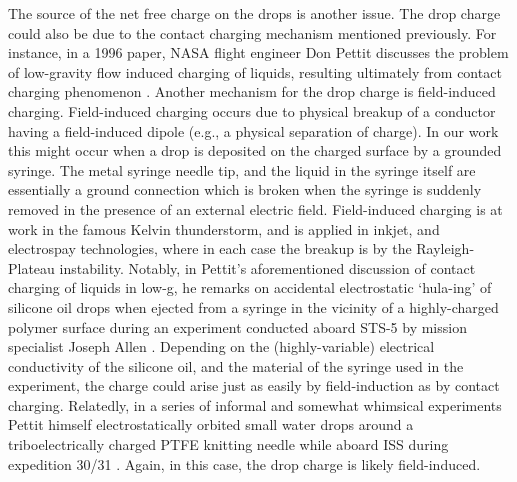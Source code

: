 \documentclass[12pt,a4paper,oneside]{book}
\begin{document}
The source of the net free charge on the drops is another issue. The drop charge could also be due to the contact charging mechanism mentioned previously. For instance, in a 1996 paper, NASA flight engineer Don Pettit discusses the problem of low-gravity flow induced charging of liquids, resulting ultimately from contact charging phenomenon \cite{pettit_donald_flow_????}. Another mechanism for the drop charge is field-induced charging. Field-induced charging occurs due to physical breakup of a conductor having a field-induced dipole (e.g., a physical separation of charge). In our work this might occur when a drop is deposited on the charged surface by a grounded syringe. The metal syringe needle tip, and the liquid in the syringe itself are essentially a ground connection which is broken when the syringe is suddenly removed in the presence of an external electric field. Field-induced charging is at work in the famous Kelvin thunderstorm, and is applied in inkjet, and electrospay technologies, where in each case the breakup is by the Rayleigh-Plateau instability. Notably, in Pettit's aforementioned discussion of contact charging of liquids in low-g, he remarks on accidental electrostatic `hula-ing' of silicone oil drops when ejected from a syringe in the vicinity of a highly-charged polymer surface during an experiment conducted aboard STS-5 by mission specialist Joseph Allen \cite{pettit_donald_flow_????}. Depending on the (highly-variable) electrical conductivity of the silicone oil, and the material of the syringe used in the experiment, the charge could arise just as easily by field-induction as by contact charging. Relatedly, in a series of informal and somewhat whimsical experiments Pettit himself electrostatically orbited small water drops around a triboelectrically charged PTFE knitting needle while aboard ISS during expedition 30/31 \cite{stevenson_electrostatic_2015}. Again, in this case, the drop charge is likely field-induced.  
\end{document}
